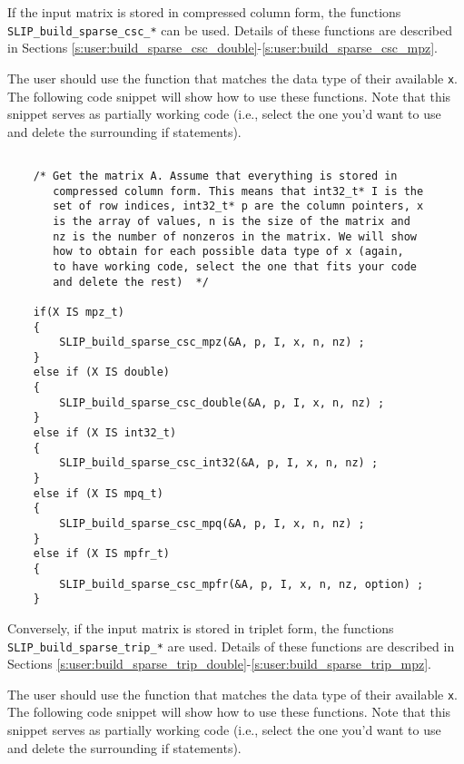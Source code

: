 \documentclass[12pt]{article}
\theoremstyle{definition}
\begin{document}
If the input matrix is stored in compressed column form, the functions \\
\verb|SLIP_build_sparse_csc_*| can be used. Details of these functions are
described in Sections
\ref{s:user:build_sparse_csc_double}-\ref{s:user:build_sparse_csc_mpz}.

The user should use the function that matches the data type of their available
\verb|x|. The following code snippet will show how to use these functions. Note
that this snippet serves as partially working code (i.e., select the one you'd
want to use and delete the surrounding if statements).

{\small
\begin{verbatim}

    /* Get the matrix A. Assume that everything is stored in
       compressed column form. This means that int32_t* I is the
       set of row indices, int32_t* p are the column pointers, x
       is the array of values, n is the size of the matrix and
       nz is the number of nonzeros in the matrix. We will show
       how to obtain for each possible data type of x (again,
       to have working code, select the one that fits your code
       and delete the rest)  */

    if(X IS mpz_t)
    {
        SLIP_build_sparse_csc_mpz(&A, p, I, x, n, nz) ;
    }
    else if (X IS double)
    {
        SLIP_build_sparse_csc_double(&A, p, I, x, n, nz) ;
    }
    else if (X IS int32_t)
    {
        SLIP_build_sparse_csc_int32(&A, p, I, x, n, nz) ;
    }
    else if (X IS mpq_t)
    {
        SLIP_build_sparse_csc_mpq(&A, p, I, x, n, nz) ;
    }
    else if (X IS mpfr_t)
    {
        SLIP_build_sparse_csc_mpfr(&A, p, I, x, n, nz, option) ;
    } \end{verbatim} }

Conversely, if the input matrix is stored in triplet form, the functions \\
\verb|SLIP_build_sparse_trip_*| are used. Details of these functions are
described in Sections
\ref{s:user:build_sparse_trip_double}-\ref{s:user:build_sparse_trip_mpz}.

The user should use the function that matches the data type of their available
\verb|x|. The following code snippet will show how to use these functions. Note
that this snippet serves as partially working code (i.e., select the one you'd
want to use and delete the surrounding if statements).
\end{document}
